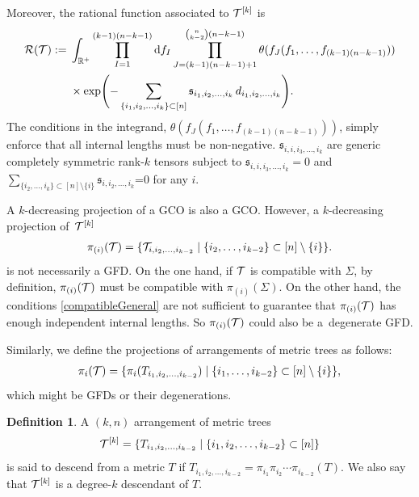 \documentclass[pdftex]{sigma}
\def \s {\sigma}
\theoremstyle{definition}
\newtheorem{defn}[thm]{Definition}
\def \s {\mathfrak{s}}
\numberwithin{equation}{section}
\begin{document}
Moreover, the rational function associated to ${\cal T}^{[k]}$ is
\begin{align}
{\cal R}({\cal T}) :={}& \int_{\mathbb{R}^+} \prod_{I=1}^{(k-1)(n-k-1)}{\rm d}f_I \prod_{J=(k-1)(n-k-1)+1}^{{n \choose k-2}(n-k-1)}\theta (f_J(f_1,\dots ,f_{(k-1)(n-k-1)}))\nonumber
\\
&
\times
\exp\Biggl(-\sum_{\{i_1,i_2,\dots,i_{k} \} \subset [n] }\s_{i_1,i_2,\dots,i_{k}}\, d_{i_1,i_2,\dots,i_{k}}\Biggr). \label{Scw3ge}
\end{align}
%
The conditions in the integrand, $\theta (f_J(f_1,\dots ,f_{(k-1)(n-k-1) }))$, simply enforce that all internal lengths must be non-negative.
$\s_{i,i,i_3,\dots,i_{k}}$ are generic completely symmetric rank-$k$ tensors subject to $\s_{i,i,i_3,\dots,i_{k}}=0$ and $\sum_{\{i_2,\dots,i_{k} \} \subset [n] \setminus \{i\}}\s_{i,i_2,\dots,i_{k}}$=0 for any $i$.

A $k$-decreasing projection of a GCO is also a GCO.
However, a $k$-decreasing projection of~${\cal T}^{[k]}$
\begin{gather*}
\pi_{(i)}({\cal T}) = \{ {\cal T}_{i,i_2,\dots,i_{k-2}}\mid \{i_2,\dots, i_{k-2}\} \subset [n] \setminus \{i\} \}.
\end{gather*}
is not necessarily a GFD. On the one hand, if ${\cal T}$ is compatible with $\Sigma$, by definition, $\pi_{(i)}({\cal T}) $ must be compatible with $\pi_{(i)}({\Sigma}) $. On the other hand,
the conditions \eqref{compatibleGeneral} are not sufficient to guarantee that $\pi_{(i)}({\cal T}) $ has enough independent internal lengths. So $\pi_{(i)}({\cal T}) $ could also be a~degenerate GFD.

Similarly, we define the projections of arrangements of metric trees as follows:
\begin{align*}%
 \pi_i({\cal T}) = \{\pi_i( T_{i_1,i_2,\dots,i_{k-2}})\mid  \{i_1,\dots,i_{k-2} \} \subset [n] \setminus \{i\}\} ,
\end{align*}
which might be GFDs or their degenerations.

\begin{defn}\label{globalGFD-New}
A $(k,n)$ arrangement of metric trees
\[
{\cal T}^{[k]} = \{T_{i_1,i_2,\dots,i_{k-2}}\mid  \{i_1,i_2,\dots,i_{k-2} \} \subset [n]\}\]
 is said to descend from a metric $T$ if $T_{i_1,i_2,\dots,i_{k-2}}=\pi_{i_1}\pi_{i_2}\cdots \pi_{i_{k-2}} (T)$. We also say that ${\cal T}^{[k]}$ is a degree-$k$ descendant of $T$.
\end{defn}
\end{document}
